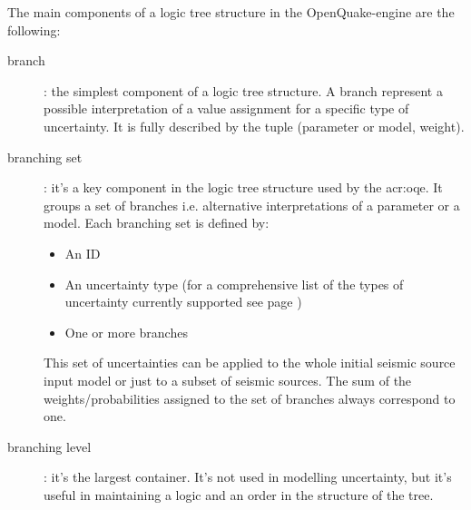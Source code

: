 The main components of a logic tree structure in the OpenQuake-engine are 
the following:
\begin{description}
    \item[branch]: the simplest component of a logic tree structure. 
    A branch represent a possible interpretation of a value assignment for
    a specific type of uncertainty. It is fully described by the tuple 
    (parameter or model, weight).

    
    \item[branching set]: it's a key component in the logic tree structure 
    used by the \gls{acr:oqe}. It groups a set of branches i.e. 
    alternative interpretations of a parameter or a model. Each branching
    set is defined by:
    \begin{itemize}
        \item An ID 
        \item An uncertainty type (for a comprehensive list of the types of 
        uncertainty currently supported see page \pageref{list_epistemic_unc})
        \item One or more branches
    \end{itemize}

    This set of uncertainties can be applied to the whole initial 
    seismic source input model or just to a subset of seismic sources.
    The sum of the weights/probabilities assigned to the set 
    of branches always correspond to one.

    \item[branching level]: it's the largest container. It's not used in 
    modelling uncertainty, but it's useful in maintaining a logic and an 
    order in the structure of the tree.
\end{description}


